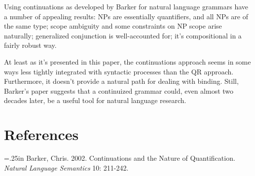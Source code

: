 \documentclass[11pt]{article}
\makeatletter
\newcommand{\hangpara}[2]{\hangindent#1\hangafter#2\noindent}
\newenvironment{hangparas}[2]{\setlength{\parindent}{\z@}%
  \everypar={\hangpara{#1}{#2}}}{\par}
\makeatother
\begin{document}
Using continuations as developed by Barker for natural language grammars have a number of appealing results: NPs are essentially quantifiers, and all NPs are of the same type; scope ambiguity and some constraints on NP scope arise naturally; generalized conjunction is well-accounted for; it's compositional in a fairly robust way.

At least as it's presented in this paper, the continuations approach seems in some ways less tightly integrated with syntactic processes than the QR approach. Furthermore, it doesn't provide a natural path for dealing with binding. Still, Barker's paper suggests that a continuized grammar could, even almost two decades later, be a useful tool for natural language research.

\section{References}

\begin{hangparas}{.25in}{1}
\small
Barker, Chris. 2002. Continuations and the Nature of Quantification. \textit{Natural Language Semantics} 10: 211-242.
\end{hangparas}
\end{document}
